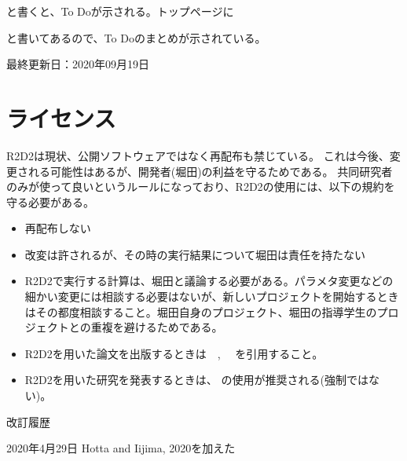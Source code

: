\documentclass[letterpaper,10pt,dvipdfmx,report]{sphinxmanual}
\begin{document}
と書くと、To Doが示される。トップページに

\begin{sphinxVerbatim}[commandchars=\\\{\}]
\end{sphinxVerbatim}

と書いてあるので、To Doのまとめが示されている。

最終更新日：2020年09月19日


\chapter{ライセンス}
\label{\detokenize{index:id1}}
R2D2は現状、公開ソフトウェアではなく再配布も禁じている。
これは今後、変更される可能性はあるが、開発者(堀田)の利益を守るためである。
共同研究者のみが使って良いというルールになっており、R2D2の使用には、以下の規約を守る必要がある。
\begin{itemize}
\item {} 
再配布しない

\item {} 
改変は許されるが、その時の実行結果について堀田は責任を持たない

\item {} 
R2D2で実行する計算は、堀田と議論する必要がある。パラメタ変更などの細かい変更には相談する必要はないが、新しいプロジェクトを開始するときはその都度相談すること。堀田自身のプロジェクト、堀田の指導学生のプロジェクトとの重複を避けるためである。

\item {} 
R2D2を用いた論文を出版するときは　, 　を引用すること。

\item {} 
R2D2を用いた研究を発表するときは、 の使用が推奨される(強制ではない)。

\end{itemize}

改訂履歴

2020年4月29日 Hotta and Iijima, 2020を加えた
\end{document}
